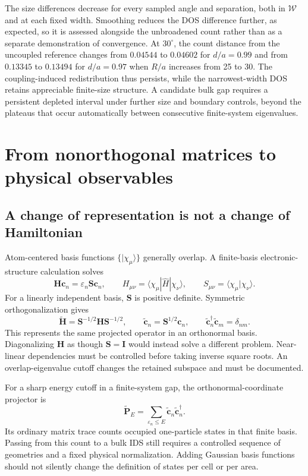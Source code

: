 \documentclass[11pt,a4paper]{article}
\begin{document}
The size differences decrease for every sampled angle and separation, both in $\mathcal W$ and at each fixed width. Smoothing reduces the DOS difference further, as expected, so it is assessed alongside the unbroadened count rather than as a separate demonstration of convergence. At $30^\circ$, the count distance from the uncoupled reference changes from $0.04544$ to $0.04602$ for $d/a=0.99$ and from $0.13345$ to $0.13494$ for $d/a=0.97$ when $R/a$ increases from 25 to 30. The coupling-induced redistribution thus persists, while the narrowest-width DOS retains appreciable finite-size structure. A candidate bulk gap requires a persistent depleted interval under further size and boundary controls, beyond the plateaus that occur automatically between consecutive finite-system eigenvalues.

\section{From nonorthogonal matrices to physical observables}

\subsection{A change of representation is not a change of Hamiltonian}

Atom-centered basis functions $\{|\chi_\mu\rangle\}$ generally overlap. A finite-basis electronic-structure calculation solves
\begin{equation}
 \bm H\bm c_n=\varepsilon_n\bm S\bm c_n,
 \qquad H_{\mu\nu}=\langle\chi_\mu|\hat H|\chi_\nu\rangle,
 \qquad S_{\mu\nu}=\langle\chi_\mu|\chi_\nu\rangle.
 \label{eq:generalized}
\end{equation}
For a linearly independent basis, $\bm S$ is positive definite. Symmetric orthogonalization gives~\cite{lowdin1950}
\begin{equation}
 \widetilde{\bm H}=\bm S^{-1/2}\bm H\bm S^{-1/2},
 \qquad \widetilde{\bm c}_n=\bm S^{1/2}\bm c_n,
 \qquad \widetilde{\bm c}_n^\dagger\widetilde{\bm c}_m=\delta_{nm}.
 \label{eq:lowdin}
\end{equation}
This represents the same projected operator in an orthonormal basis. Diagonalizing $\bm H$ as though $\bm S=\bm I$ would instead solve a different problem. Near-linear dependencies must be controlled before taking inverse square roots. An overlap-eigenvalue cutoff changes the retained subspace and must be documented.

For a sharp energy cutoff in a finite-system gap, the orthonormal-coordinate projector is
\begin{equation}
 \widetilde{\bm P}_E=\sum_{\varepsilon_n\leq E}
 \widetilde{\bm c}_n\widetilde{\bm c}_n^\dagger.
 \label{eq:finiteprojector}
\end{equation}
Its ordinary matrix trace counts occupied one-particle states in that finite basis. Passing from this count to a bulk IDS still requires a controlled sequence of geometries and a fixed physical normalization. Adding Gaussian basis functions should not silently change the definition of states per cell or per area.
\end{document}

